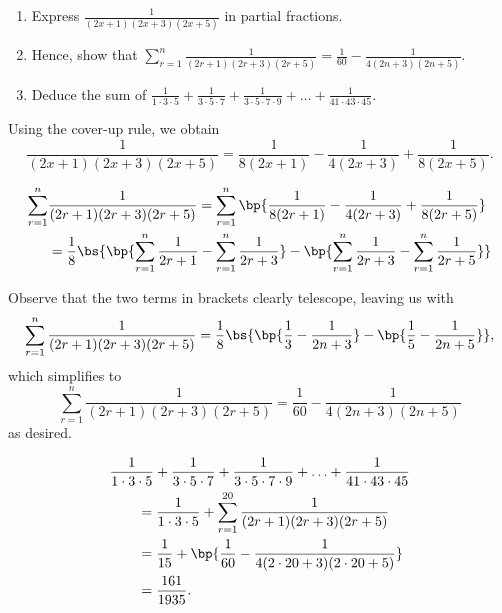 \begin{problem}
    \begin{enumerate}
        \item Express $\frac1{(2x+1)(2x+3)(2x+5)}$ in partial fractions.
        \item Hence, show that $\sum_{r=1}^n \frac1{(2r+1)(2r+3)(2r+5)} = \frac1{60} - \frac1{4(2n+3)(2n+5)}$.
        \item Deduce the sum of $\frac1{1\cdot 3\cdot5} + \frac1{3 \cdot 5 \cdot 7} + \frac1{3 \cdot 5 \cdot 7 \cdot 9} + \ldots + \frac1{41 \cdot 43 \cdot 45}$.
    \end{enumerate}
\end{problem}
\begin{solution}
    \begin{ppart}
        Using the cover-up rule, we obtain \[\frac1{(2x+1)(2x+3)(2x+5)} = \frac{1}{8(2x+1)} - \frac{1}{4(2x+3)} + \frac{1}{8(2x+5)}.\]
    \end{ppart}
    \begin{ppart}
        \begin{align*}
            \sum_{r=1}^n &\frac1{(2r+1)(2r+3)(2r+5)} = \sum_{r=1}^n \bp{\frac{1}{8(2r+1)} - \frac{1}{4(2r+3)} + \frac{1}{8(2r+5)}}\\
            &= \frac18 \bs{\bp{\sum_{r=1}^n \frac{1}{2r+1} -\sum_{r=1}^n\frac{1}{2r+3}} - \bp{\sum_{r=1}^n\frac{1}{2r+3} - \sum_{r=1}^n\frac{1}{2r+5}}}
        \end{align*}

        Observe that the two terms in brackets clearly telescope, leaving us with \[\sum_{r=1}^n \frac1{(2r+1)(2r+3)(2r+5)} = \frac18 \bs{\bp{\frac13 - \frac1{2n+3}} - \bp{\frac15 - \frac1{2n+5}}},\] which simplifies to \[\sum_{r=1}^n \frac1{(2r+1)(2r+3)(2r+5)} = \frac1{60} - \frac1{4(2n+3)(2n+5)}\] as desired.
    \end{ppart}
    \begin{ppart}
        \begin{align*}
            & \frac1{1\cdot 3\cdot5} + \frac1{3 \cdot 5 \cdot 7} + \frac1{3 \cdot 5 \cdot 7 \cdot 9} + \ldots + \frac1{41 \cdot 43 \cdot 45} \\
            &\hspace{2em}= \frac1{1 \cdot 3 \cdot 5} + \sum_{r = 1}^{20} \frac1{(2r+1)(2r+3)(2r+5)}\\
            &\hspace{2em}= \frac1{15} + \bp{\frac1{60} - \frac1{4(2\cdot20+3)(2\cdot20+5)}}\\
            &\hspace{2em}= \frac{161}{1935}.
        \end{align*}
    \end{ppart}
\end{solution}